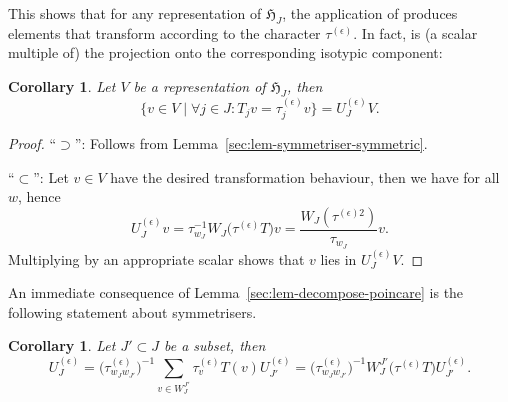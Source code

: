 \documentclass[pdftex]{sigma}
\newtheorem{Corollary}[Theorem]{Corollary}
\theoremstyle{definition}
\numberwithin{equation}{section}
\begin{document}
This shows that for any representation of $\mathfrak{H}_J$, the application of 
produces elements that transform according to the character $\tau^{(\epsilon)}$. In fact, 
is (a scalar multiple of) the projection onto the corresponding isotypic component:
\begin{Corollary}\label{sec:cor-makes-symmetric}
 Let $V$ be a representation of $\mathfrak{H}_J$, then
 \[
 \big\{v\in V\mid \forall j\in J\colon T_j v = \tau^{(\epsilon)}_j v\big\}
 = U^{(\epsilon)}_J V.
 \]
\end{Corollary}
\begin{proof}
``$\supset$'': Follows from Lemma~\ref{sec:lem-symmetriser-symmetric}.

``$\subset$'': Let $v\in V$ have the desired transformation behaviour, then we have  for all $w$, hence
 \[
 U^{(\epsilon)}_J v
 = \tau_{w_J}^{-1} W_J\bigl(\tau^{(\epsilon)}T\bigr) v
 = \frac{W_J(\tau^{(\epsilon)2})}{\tau_{w_J}}v.
 \]
 Multiplying by an appropriate scalar shows that $v$ lies
 in $U^{(\epsilon)}_JV.$
\end{proof}

An immediate consequence of Lemma~\ref{sec:lem-decompose-poincare} is
the following statement about symmetrisers.

\begin{Corollary}\label{sec:lem-decomposition-symmetriser}
 Let $J'\subset J$ be a subset, then
 \[
 U^{(\epsilon)}_J = \bigl(\tau^{(\epsilon)}_{w_Jw_{J'}}\bigr)^{-1}\sum_{v\in W_J^{J'}} \tau^{(\epsilon)}_v
 T(v) U^{(\epsilon)}_{J'}
 = \bigl(\tau^{(\epsilon)}_{w_Jw_{J'}}\bigr)^{-1} W_J^{J'}\bigl(\tau^{(\epsilon)}T\bigr)
 U^{(\epsilon)}_{J'}.
 \]
\end{Corollary}
\end{document}

